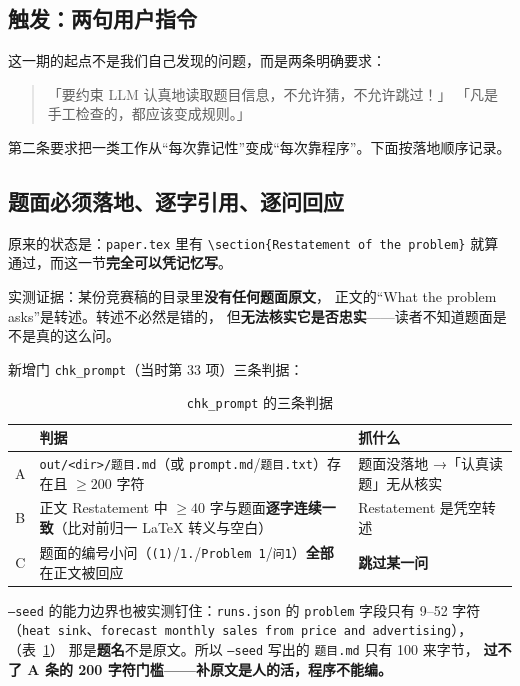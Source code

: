 \documentclass[11pt,a4paper]{article}
\newcommand{\code}[1]{\texttt{#1}}
\begin{document}
\subsection{触发：两句用户指令}
这一期的起点不是我们自己发现的问题，而是两条明确要求：
\begin{quote}\small
「要约束 LLM 认真地读取题目信息，不允许猜，不允许跳过！」
「凡是手工检查的，都应该变成规则。」
\end{quote}

第二条要求把一类工作从“每次靠记性”变成“每次靠程序”。下面按落地顺序记录。

\subsection{题面必须落地、逐字引用、逐问回应}
原来的状态是：\code{paper.tex} 里有 \code{\textbackslash section\{Restatement of the problem\}}
就算通过，而这一节\textbf{完全可以凭记忆写}。

实测证据：某份竞赛稿的目录里\textbf{没有任何题面原文}，
正文的“What the problem asks”是转述。转述不必然是错的，
但\textbf{无法核实它是否忠实}——读者不知道题面是不是真的这么问。

新增门 \code{chk\_prompt}（当时第 33 项）三条判据：

\begin{table}[tbp]\centering\small
\caption{\code{chk\_prompt} 的三条判据}\label{tab:prompt}
\setlength{\tabcolsep}{4pt}
\begin{tabular}{cp{6.4cm}p{6.2cm}}
\toprule
& 判据 & 抓什么\\
\midrule
A & \code{out/<dir>/题目.md}（或 \code{prompt.md}/\code{题目.txt}）存在且 $\ge 200$ 字符 & 题面没落地 →「认真读题」无从核实\\
B & 正文 Restatement 中 $\ge 40$ 字与题面\textbf{逐字连续一致}（比对前归一 \LaTeX{} 转义与空白） & Restatement 是凭空转述\\
C & 题面的编号小问（\code{(1)}/\code{1.}/\code{Problem 1}/\code{问1}）\textbf{全部}在正文被回应 & \textbf{跳过某一问}\\
\bottomrule
\end{tabular}
\end{table}

\code{--seed} 的能力边界也被实测钉住：\code{runs.json} 的 \code{problem} 字段只有
9--52 字符（\code{heat sink}、\code{forecast monthly sales from price and advertising}），（表~\ref{tab:prompt}）
那是\textbf{题名}不是原文。所以 \code{--seed} 写出的 \code{题目.md} 只有 100 来字节，
\textbf{过不了 A 条的 200 字符门槛——补原文是人的活，程序不能编。}
\end{document}
